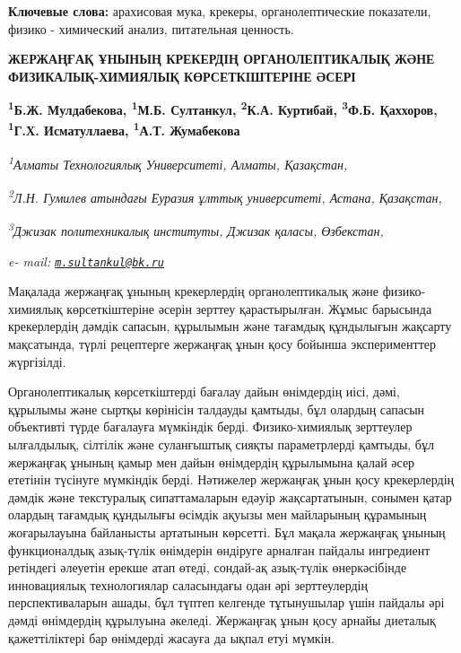 {\bfseries Ключевые слова:} арахисовая мука, крекеры, органолептические
показатели, физико - химический анализ, питательная ценность.

\begin{articleheader}
{\bfseries ЖЕРЖАҢҒАҚ ҰНЫНЫҢ КРЕКЕРДІҢ ОРГАНОЛЕПТИКАЛЫҚ ЖӘНЕ ФИЗИКАЛЫҚ-ХИМИЯЛЫҚ КӨРСЕТКІШТЕРІНЕ ӘСЕРІ}

{\bfseries
\textsuperscript{1}Б.Ж. Мулдабекова,
\textsuperscript{1}М.Б. Султанкул\textsuperscript{\envelope },
\textsuperscript{2}К.А. Куртибай,
\textsuperscript{3}Ф.Б. Қаххоров,
\textsuperscript{1}Г.Х. Исматуллаева,
\textsuperscript{1}А.Т. Жумабекова}
\end{articleheader}

\begin{affiliation}
\emph{\textsuperscript{1}Алматы Технологиялық Университеті, Алматы, Қазақстан,}

\emph{\textsuperscript{2}Л.Н. Гумилев атындағы Еуразия ұлттық университеті, Астана, Қазақстан,}

\emph{\textsuperscript{3}Джизак политехникалық институты, Джизак қаласы, Өзбекстан,}

\emph{e- mail: \href{mailto:m.sultankul@bk.ru}{\nolinkurl{m.sultankul@bk.ru}}}
\end{affiliation}

Мақалада жержаңғақ ұнының крекерлердің органолептикалық және
физико-химиялық көрсеткіштеріне әсерін зерттеу қарастырылған. Жұмыс
барысында крекерлердің дәмдік сапасын, құрылымын және тағамдық
құндылығын жақсарту мақсатында, түрлі рецептерге жержаңғақ ұнын қосу
бойынша эксперименттер жүргізілді.

Органолептикалық көрсеткіштерді бағалау дайын өнімдердің иісі, дәмі,
құрылымы және сыртқы көрінісін талдауды қамтыды, бұл олардың сапасын
объективті түрде бағалауға мүмкіндік берді. Физико-химиялық зерттеулер
ылғалдылық, сілтілік және суланғыштық сияқты параметрлерді қамтыды, бұл
жержаңғақ ұнының қамыр мен дайын өнімдердің құрылымына қалай әсер
ететінін түсінуге мүмкіндік берді. Нәтижелер жержаңғақ ұнын қосу
крекерлердің дәмдік және текстуралық сипаттамаларын едәуір
жақсартатынын, сонымен қатар олардың тағамдық құндылығы өсімдік ақуызы
мен майларының құрамының жоғарылауына байланысты артатынын көрсетті. Бұл
мақала жержаңғақ ұнының функционалдық азық-түлік өнімдерін өндіруге
арналған пайдалы ингредиент ретіндегі әлеуетін ерекше атап өтеді,
сондай-ақ азық-түлік өнеркәсібінде инновациялық технологиялар
саласындағы одан әрі зерттеулердің перспективаларын ашады, бұл түптеп
келгенде тұтынушылар үшін пайдалы әрі дәмді өнімдердің құрылуына
әкеледі. Жержаңғақ ұнын қосу арнайы диеталық қажеттіліктері бар
өнімдерді жасауға да ықпал етуі мүмкін.

